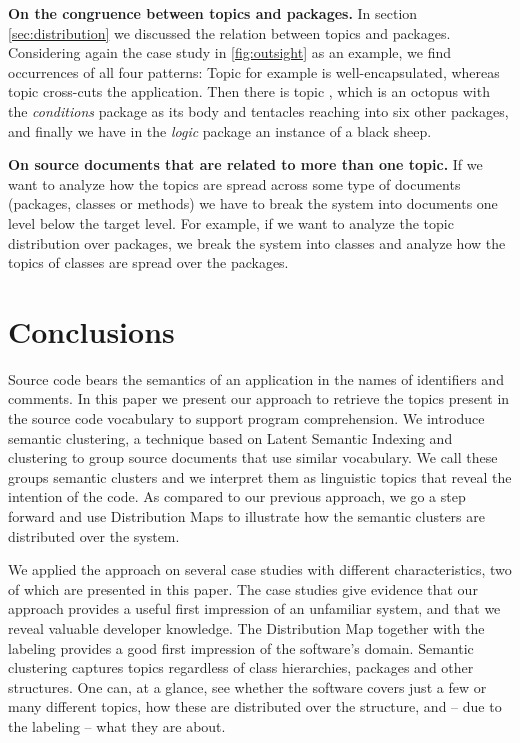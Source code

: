 \textbf{On the congruence between topics and packages.} In section \autoref{sec:distribution} we discussed the relation between topics and packages. Considering again the case study in \autoref{fig:outsight} as an example, we find occurrences of all four patterns: Topic \darkgreen for example is well-encapsulated, whereas topic \yellow cross-cuts the application. Then there is topic \blue, which is an octopus with the \emph{conditions} package as its body and tentacles reaching into six other packages, and finally we have in the \emph{logic} package an instance of a black sheep.

\textbf{On source documents that are related to more than one topic.} If we want to analyze how the topics are spread across some type of documents (\eg packages, classes or methods) we have to break the system into documents one level below the target level. For example, if we want to analyze the topic distribution over packages, we break the system into classes and analyze how the topics of classes are spread over the packages.

\section{Conclusions}\label{sec:conclusions}

Source code bears the semantics of an application in the names of identifiers and comments. In this paper we present our approach to retrieve the topics present in the source code vocabulary to support program comprehension. We introduce semantic clustering, a technique based on Latent Semantic Indexing and clustering to group source documents that use similar vocabulary. We call these groups semantic clusters and we interpret them as linguistic topics that reveal the intention of the code. As compared to our previous approach, we go a step forward and use Distribution Maps to illustrate how the semantic clusters are distributed over the system.

We applied the approach on several case studies with different characteristics, two of which are presented in this paper.  The case studies give evidence that our approach provides a useful first impression of an unfamiliar system, and that we reveal valuable developer knowledge. The Distribution Map together with the labeling provides a good first impression of the software's domain. Semantic clustering captures topics regardless of class hierarchies, packages and other structures. One can, at a glance, see whether the software covers just a few or many different topics, how these are distributed over the structure, and -- due to the labeling -- what they are about.

